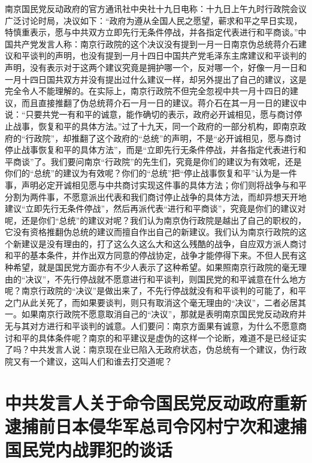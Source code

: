 \documentclass[UTF-8, a5paper, 12pt]{ctexart}
\begin{document}
南京国民党反动政府的官方通讯社中央社十九日电称：十九日上午九时行政院会议广泛讨论时局，决议如下：“政府为遵从全国人民之愿望，蕲求和平之早日实现，特慎重表示，愿与中共双方立即先行无条件停战，并各指定代表进行和平商谈。”中国共产党发言人称：南京行政院的这个决议没有提到一月一日南京伪总统蒋介石建议和平谈判的声明，也没有提到一月十四日中国共产党毛泽东主席建议和平谈判的声明，没有表示对于这两个建议究竟是拥护哪一个，反对哪一个，好像一月一日和一月十四日国共双方并没有提出过什么建议一样，却另外提出了自己的建议，这是完全令人不能理解的。在实际上，南京行政院不但完全忽视中共一月十四日的建议，而且直接推翻了伪总统蒋介石一月一日的建议。蒋介石在其一月一日的建议中说：“只要共党一有和平的诚意，能作确切的表示，政府必开诚相见，愿与商讨停止战事，恢复和平的具体方法。”过了十九天，同一个政府的一部分机构，即南京政府的“行政院”，却推翻了这个政府的“总统”的声明，不是“必开诚相见，愿与商讨停止战事恢复和平的具体方法”，而是“立即先行无条件停战，并各指定代表进行和平商谈”了。我们要问南京“行政院”的先生们，究竟是你们的建议为有效呢，还是你们的“总统”的建议为有效呢？你们的“总统”把“停止战事恢复和平”认为是一件事，声明必定开诚相见愿与中共商讨实现这件事的具体方法；你们则将战争与和平分割为两件事，不愿意派出代表和我们商讨停止战争的具体方法，而却异想天开地建议“立即先行无条件停战”，然后再派代表“进行和平商谈”，究竟是你们的建议对呢，还是你们“总统”的建议对呢？我们认为南京伪行政院是越出了自己的职权的，它没有资格推翻伪总统的建议而擅自作出自己的新建议。我们认为南京行政院的这个新建议是没有理由的，打了这么久这么大和这么残酷的战争，自应双方派人商讨和平的基本条件，并作出双方同意的停战协定，战争才能停得下来。不但人民有这种希望，就是国民党方面亦有不少人表示了这种希望。如果照南京行政院的毫无理由的“决议”，不先行停战就不愿意进行和平谈判，则国民党的和平诚意在什么地方呢？南京行政院的“决议”是做出来了，不先行停战就没有和平谈判的可能了，和平之门从此关死了，而如果要谈判，则只有取消这个毫无理由的“决议”，二者必居其一。如果南京行政院不愿意取消自己的“决议”，那就是表明南京国民党反动政府并无与其对方进行和平谈判的诚意。人们要问：南京方面果有诚意，为什么不愿意商讨和平的具体条件呢？南京的和平建议是虚伪的这样一个论断，难道不是已经证实了吗？中共发言人说：南京现在业已陷入无政府状态，伪总统有一个建议，伪行政院又有一个建议，这叫人们和谁去打交道呢？ 








\section{中共发言人关于命令国民党反动政府重新逮捕前日本侵华军总司令冈村宁次和逮捕国民党内战罪犯的谈话
}
\end{document}
